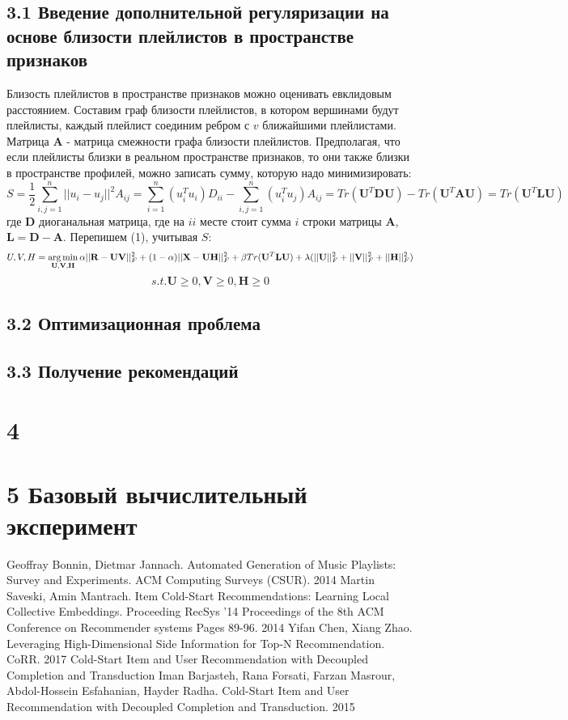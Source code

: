 \documentclass[12pt,twoside]{article}
\begin{document}
\subsection{3.1 Введение дополнительной регуляризации на основе близости плейлистов в пространстве признаков}

Близость плейлистов в пространстве признаков можно оценивать евклидовым расстоянием. Составим граф близости плейлистов, в котором вершинами будут плейлисты, каждый плейлист соединим ребром с $v$ ближайшими плейлистами. Матрица $\mathbf{A}$ - матрица смежности графа близости плейлистов. Предполагая, что если плейлисты близки в реальном пространстве признаков, то они также близки в пространстве профилей, можно записать сумму, которую надо минимизировать:
$$S = \frac{1}{2}\sum_{i, j = 1}^n||u_i - u_j||^2A_{ij} = \sum_{i = 1}^n (u_i^Tu_i)D_{ii} - \sum_{i,j = 1}^n (u_i^Tu_j)A_{ij} = {Tr}(\mathbf{U}^T\mathbf{DU}) -  {Tr}(\mathbf{U}^T\mathbf{AU}) = {Tr}(\mathbf{U}^T\mathbf{LU})$$
где $\mathbf{D}$ диоганальная матрица, где на $ii$ месте стоит сумма $i$ строки матрицы $\mathbf{A}$, $\mathbf{L} = \mathbf{D} - \mathbf{A}$. Перепишем (1), учитывая $S$:
$$U, V, H = \argmin_{\mathbf{U, V, H}}\alpha||\mathbf{R} - \mathbf{UV}||_F^2 +(1 - \alpha) ||\mathbf{X} - \mathbf{UH}||_F^2 +  \beta{Tr}(\mathbf{U}^T\mathbf{LU}) +  \lambda(||\mathbf{U}||_F^2 + ||\mathbf{V}||_F^2 + ||\mathbf{H}||_F^2)$$
$$ s.t. \mathbf{U} \geq 0,  \mathbf{V} \geq 0,  \mathbf{H} \geq 0$$

\subsection{3.2 Оптимизационная проблема}

\subsection{3.3 Получение рекомендаций}

\section{4}

\section{5 Базовый вычислительный эксперимент}

\begin{thebibliography}{4}
 Geoffray Bonnin,  	Dietmar Jannach. Automated Generation of Music Playlists: Survey and Experiments. ACM Computing Surveys (CSUR). 2014
Martin Saveski, Amin Mantrach. Item Cold-Start Recommendations:
Learning Local Collective Embeddings. Proceeding
RecSys '14 Proceedings of the 8th ACM Conference on Recommender systems
Pages 89-96. 2014
Yifan Chen, Xiang Zhao. Leveraging High-Dimensional Side Information for Top-N Recommendation. CoRR. 2017
Cold-Start Item and User Recommendation with Decoupled Completion and Transduction
Iman Barjasteh, Rana Forsati, Farzan Masrour, Abdol-Hossein Esfahanian, Hayder Radha. Cold-Start Item and User Recommendation with Decoupled Completion and Transduction. 2015
\end{thebibliography}
\end{document}
